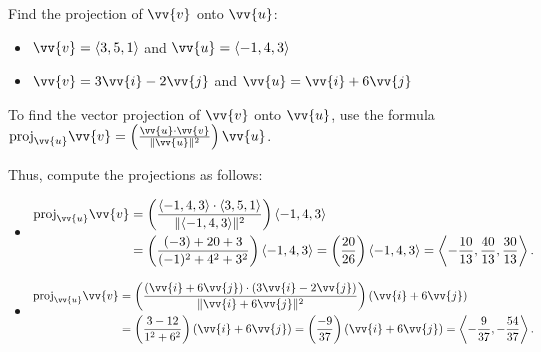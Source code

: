 \documentclass{article}
\begin{document}
\begin{examplebox}
    Find the projection of \(\vv{v}\) onto \(\vv{u}\):
    \begin{itemize}
        \item \(\vv{v} = \langle 3, 5, 1 \rangle\) and \(\vv{u} = \langle -1, 4, 3 \rangle\)
        \item \(\vv{v} = 3\vv{i} - 2\vv{j}\) and \(\vv{u} = \vv{i} + 6\vv{j}\)
    \end{itemize}

    \begin{solutionbox}
        \begin{conceptbox}
        To find the vector projection of \(\vv{v}\) onto \(\vv{u}\), use the formula \(\text{proj}_{\vv{u}} \vv{v} = \left( \frac{\vv{u} \cdot \vv{v}}{\|\vv{u}\|^2} \right) \vv{u}\).
        \end{conceptbox}
        Thus, compute the projections as follows:
        \begin{itemize}
            \item \begin{align*}
                \text{proj}_{\vv{u}} \vv{v} &= \left( \frac{\langle -1, 4, 3 \rangle \cdot \langle 3, 5, 1 \rangle}{\|\langle -1, 4, 3 \rangle\|^2} \right) \langle -1, 4, 3 \rangle \\
                &= \left( \frac{(-3) + 20 + 3}{(-1)^2 + 4^2 + 3^2} \right) \langle -1, 4, 3 \rangle = \left( \frac{20}{26} \right) \langle -1, 4, 3 \rangle = \left\langle -\frac{10}{13}, \frac{40}{13}, \frac{30}{13} \right\rangle.
            \end{align*}
            \item \begin{align*}
                \text{proj}_{\vv{u}} \vv{v} &= \left( \frac{(\vv{i} + 6\vv{j}) \cdot (3\vv{i} - 2\vv{j})}{\|\vv{i} + 6\vv{j}\|^2} \right) (\vv{i} + 6\vv{j}) \\
                &= \left( \frac{3 - 12}{1^2 + 6^2} \right) (\vv{i} + 6\vv{j}) = \left( \frac{-9}{37} \right) (\vv{i} + 6\vv{j}) = \left\langle -\frac{9}{37}, -\frac{54}{37} \right\rangle.
            \end{align*}
        \end{itemize}
    \end{solutionbox}
\end{examplebox}
\end{document}
